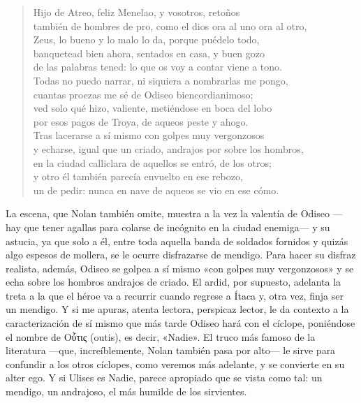 \documentclass[11pt,a4paper]{article}
\newcommand{\gr}[1]{\foreignlanguage{greek}{#1}}
\begin{document}
\begin{verse}
Hijo de Atreo, feliz Menelao, y vosotros, retoños\\
también de hombres de pro, como el dios ora al uno ora al otro,\\
Zeus, lo bueno y lo malo lo da, porque puédelo todo,\\
banquetead bien ahora, sentados en casa, y buen gozo\\
de las palabras tened: lo que os voy a contar viene a tono.\\
Todas no puedo narrar, ni siquiera a nombrarlas me pongo,\\
cuantas proezas me sé de Odiseo biencordianimoso;\\
ved solo qué hizo, valiente, metiéndose en boca del lobo\\
por esos pagos de Troya, de aqueos peste y ahogo.\\
Tras lacerarse a sí mismo con golpes muy vergonzosos\\
y echarse, igual que un criado, andrajos por sobre los hombros,\\
en la ciudad calliclara de aquellos se entró, de los otros;\\
y otro él también parecía envuelto en ese rebozo,\\
un de pedir: nunca en nave de aqueos se vio en ese cómo.
\end{verse}

La escena, que Nolan también omite, muestra a la vez la valentía de Odiseo ---hay que tener agallas para colarse de incógnito en la ciudad enemiga--- y su astucia, ya que solo a él, entre toda aquella banda de soldados fornidos y quizás algo espesos de mollera, se le ocurre disfrazarse de mendigo. Para hacer su disfraz realista, además, Odiseo se golpea a sí mismo «con golpes muy vergonzosos» y se echa sobre los hombros andrajos de criado. El ardid, por supuesto, adelanta la treta a la que el héroe va a recurrir cuando regrese a Ítaca y, otra vez, finja ser un mendigo. Y si me apuras, atenta lectora, perspicaz lector, le da contexto a la caracterización de sí mismo que más tarde Odiseo hará con el cíclope, poniéndose el nombre de \gr{Οὖτις} (outis), es decir, «Nadie». El truco más famoso de la literatura ---que, increíblemente, Nolan también pasa por alto--- le sirve para confundir a los otros cíclopes, como veremos más adelante, y se convierte en su alter ego. Y si Ulises es Nadie, parece apropiado que se vista como tal: un mendigo, un andrajoso, el más humilde de los sirvientes.
\end{document}
